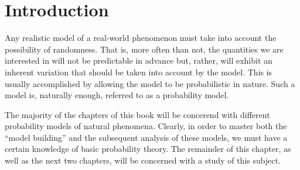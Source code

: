 \section{Introduction}

Any realistic model of a real-world phenomenon must take into account the possibility of randomness. That is, more often than not, the quantities we are interested in will not be predictable in advance but, rather, will exhibit an inherent variation that should be taken into account by the model. This is usually accomplished by allowing the model to be probabilistic in nature. Such a model is, naturally enough, referred to as a probability model.

The majority of the chapters of this book will be concerend with different probability models of natural phenomena. Clearly, in order to master both the ``model building'' and the subsequent analysis of these models, we must have a certain knowledge of basic probability theory. The remainder of this chapter, as well as the next two chapters, will be concerned with a study of this subject.